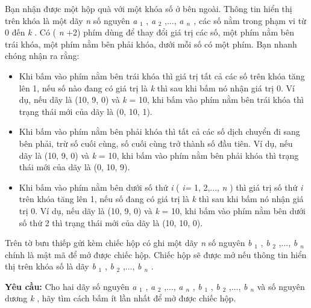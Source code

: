 Bạn nhận được một hộp quà với một khóa số ở bên ngoài. Thông tin hiển thị trên khóa là một dãy \emph{ n } số nguyên \emph{ a }$_ 1 $ , \emph{ a }$_ 2 $ ,..., \emph{ a $_ n $ , } các số nằm trong phạm vi từ 0 đến \emph{ k } . Có ( \emph{ n } +2) phím dùng để thay đổi giá trị các số, một phím nằm bên trái khóa, một phím nằm bên phải khóa, dưới mỗi số có một phím. Bạn nhanh chóng nhận ra rằng:
\begin{itemize}
	\item Khi bấm vào phím nằm bên trái khóa thì giá trị tất cả các số trên khóa tăng lên 1, nếu số nào đang có giá trị là \emph{ k } thì sau khi bấm nó nhận giá trị 0. Ví dụ, nếu dãy là (10, 9, 0) và \emph{ k } = 10, khi bấm vào phím nằm bên trái khóa thì trạng thái mới của dãy là (0, 10, 1).
	\item Khi bấm vào phím nằm bên phải khóa thì tất cả các số dịch chuyển đi sang bên phải, trừ số cuối cùng, số cuối cùng trở thành số đầu tiên. Ví dụ, nếu dãy là (10, 9, 0) và \emph{ k } = 10, khi bấm vào phím nằm bên phải khóa thì trạng thái mới của dãy là (0, 10, 9).
	\item Khi bấm vào phím nằm bên dưới số thứ \emph{ i } ( \emph{ i= } 1, 2,..., \emph{ n } ) thì giá trị số thứ \emph{ i } trên khóa tăng lên 1, nếu số đang có giá trị là \emph{ k } thì sau khi bấm nó nhận giá trị 0. Ví dụ, nếu dãy là (10, 9, 0) và \emph{ k } = 10, khi bấm vào phím nằm bên dưới số thứ 2 thì trạng thái mới của dãy là (10, 10, 0).
\end{itemize}

Trên tờ bưu thiếp gửi kèm chiếc hộp có ghi một dãy \emph{ n } số nguyên \emph{ b }$_ 1 $ , \emph{ b }$_ 2 $ ,..., \emph{ b $_ n $} chính là mật mã để mở được chiếc hộp. Chiếc hộp sẽ được mở nếu thông tin hiển thị trên khóa số là dãy \emph{ b }$_ 1 $ , \emph{ b }$_ 2 $ ,..., \emph{ b $_ n $} .

\textbf{Yêu cầu: } Cho hai dãy số nguyên \emph{ a }$_ 1 $ , \emph{ a }$_ 2 $ ,..., \emph{ a $_ n $} , \emph{ b }$_ 1 $ , \emph{ b }$_ 2 $ ,..., \emph{ b $_ n $} và số nguyên dương \emph{ k } , hãy tìm cách bấm ít lần nhất để mở được chiếc hộp.

\